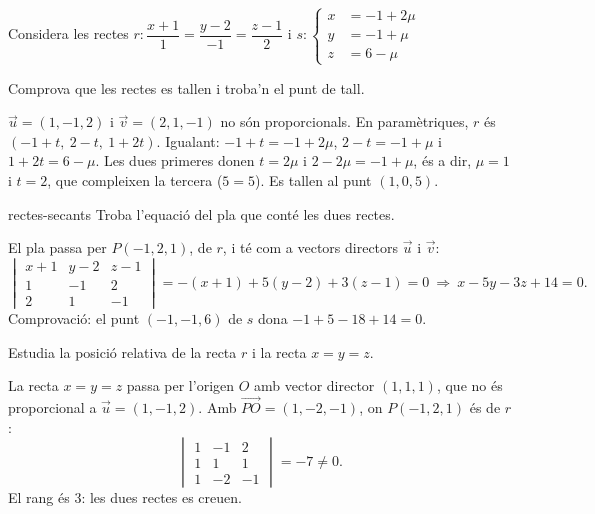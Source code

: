 Considera les rectes $r\colon\dfrac{x+1}{1}=\dfrac{y-2}{-1}=\dfrac{z-1}{2}$ i
$s\colon\left\{\begin{aligned}x&=-1+2\mu\\y&=-1+\mu\\z&=6-\mu\end{aligned}\right.$

\begin{apartats}

Comprova que les rectes es tallen i troba'n el punt de tall.

\begin{solucio}
$\vec u=(1,-1,2)$ i $\vec v=(2,1,-1)$ no són proporcionals. En paramètriques, $r$ és
$(-1+t,\ 2-t,\ 1+2t)$. Igualant: $-1+t=-1+2\mu$, $2-t=-1+\mu$ i $1+2t=6-\mu$. Les dues primeres donen
$t=2\mu$ i $2-2\mu=-1+\mu$, és a dir, $\mu=1$ i $t=2$, que compleixen la tercera ($5=5$). Es tallen al
punt $(1,0,5)$.
\end{solucio}

\begin{tria}{rectes-secants}
Troba l'equació del pla que conté les dues rectes.

\begin{solucio}
El pla passa per $P(-1,2,1)$, de $r$, i té com a vectors directors $\vec u$ i $\vec v$:
\[
\begin{vmatrix}x+1&y-2&z-1\\1&-1&2\\2&1&-1\end{vmatrix}=-(x+1)+5(y-2)+3(z-1)=0
\ \Longrightarrow\ x-5y-3z+14=0.
\]
Comprovació: el punt $(-1,-1,6)$ de $s$ dona $-1+5-18+14=0$.
\end{solucio}

Estudia la posició relativa de la recta $r$ i la recta $x=y=z$.

\begin{solucio}
La recta $x=y=z$ passa per l'origen $O$ amb vector director $(1,1,1)$, que no és proporcional a
$\vec u=(1,-1,2)$. Amb $\overrightarrow{PO}=(1,-2,-1)$, on $P(-1,2,1)$ és de $r$:
\[
\begin{vmatrix}1&-1&2\\1&1&1\\1&-2&-1\end{vmatrix}=-7\ne0.
\]
El rang és 3: les dues rectes es creuen.
\end{solucio}
\end{tria}


\end{apartats}
